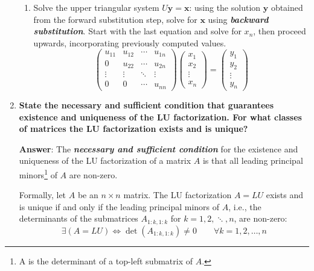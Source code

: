 \begin{enumerate}[label=\textcolor{Green3}{\textbf{\arabic*.}}]
\begin{enumerate}
        \item Solve the upper triangular system $U\mathbf{y} = \mathbf{x}$: using the solution $\mathbf{y}$ obtained from the forward substitution step, solve for $\mathbf{x}$ using \textbf{\emph{backward substitution}}. Start with the last equation and solve for $x_{n}$, then proceed upwards, incorporating previously computed values.
        \begin{equation*}
            \begin{pmatrix}
                u_{11} & u_{12} & \cdots & u_{1n} \\
                0      & u_{22} & \cdots & u_{2n} \\
                \vdots & \vdots & \ddots & \vdots \\
                0      & 0      & \cdots & u_{nn}
                \end{pmatrix}
                \begin{pmatrix}
                x_{1} \\ x_{2} \\ \vdots \\ x_{n}
                \end{pmatrix}
                =
                \begin{pmatrix}
                y_{1} \\ y_{2} \\ \vdots \\ y_{n}
            \end{pmatrix}
        \end{equation*}
    \end{enumerate}


    \newpage

    \item \textcolor{Green3}{\textbf{%
        State the necessary and sufficient condition that guarantees existence and uniqueness of the LU factorization. For what classes of matrices the LU factorization exists and is unique?
    }}

    \textbf{Answer}: The \textbf{\emph{necessary and sufficient condition}} for the existence and uniqueness of the LU factorization of a matrix $A$ is that all leading principal minors\footnote{A  is the determinant of a top-left submatrix of $A$.} of $A$ are non-zero.
    
    Formally, let $A$ be an $n \times n$ matrix. The LU factorization $A = LU$ exists and is unique if and only if the leading principal minors of $A$, i.e., the determinants of the submatrices $A_{1:k, 1:k}$ for $k = 1, 2, \ddots, n$, are non-zero:
    \begin{equation*}
        \exists\left(A = LU\right) \iff \det(A_{1:k, 1:k}) \neq 0 \hspace{2em} \forall k = 1, 2, \dots, n
    \end{equation*}


\end{enumerate}
